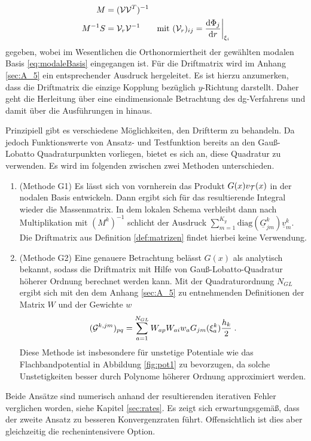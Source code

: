 \begin{align*}
  M &= (\mathcal{V}\mathcal{V}^T)^{-1} \\
  M^{-1}S &= \mathcal{V}_r \mathcal{V}^{-1} \qquad \text{mit } (\mathcal{V}_r)_{ij} = \frac{\mathrm{d}\Phi_j}{\mathrm{d}r}\biggr\rvert_{\xi_i}
\end{align*}
gegeben, wobei im Wesentlichen die Orthonormiertheit der gewählten modalen Basis \eqref{eq:modaleBasis} eingegangen ist. Für die Driftmatrix wird im Anhang \ref{sec:A_5} ein entsprechender Ausdruck hergeleitet. Es ist hierzu anzumerken, dass die Driftmatrix die einzige Kopplung bezüglich $y$-Richtung darstellt. Daher geht die Herleitung über eine eindimensionale Betrachtung des \ac{dg}-Verfahrens und damit über die Ausführungen in \cite{buch} hinaus.

Prinzipiell gibt es verschiedene Möglichkeiten, den Driftterm zu behandeln. Da jedoch Funktionswerte von Ansatz- und Testfunktion bereits an den Gauß-Lobatto Quadraturpunkten vorliegen, bietet es sich an, diese Quadratur zu verwenden. Es wird im folgenden zwischen zwei Methoden unterschieden.
\begin{enumerate}
  \item (Methode G1) Es lässt sich von vornherein das Produkt $G(x)v_{\mathcal{T}}(x)$ in der nodalen Basis entwickeln. Dann ergibt sich für das resultierende Integral wieder die Massenmatrix. In dem lokalen Schema verbleibt dann nach Multiplikation mit $(M^k)^{-1}$ schlicht der Ausdruck ${\sum_{m=1}^{K_y}\text{diag}(\underline{G}^k_{jm})\underline{v}_m^k}$. Die Driftmatrix aus Definition \ref{def:matrizen} findet hierbei keine Verwendung.
  \item (Methode G2) Eine genauere Betrachtung belässt $G(x)$ als analytisch bekannt, sodass die Driftmatrix mit Hilfe von Gauß-Lobatto-Quadratur höherer Ordnung berechnet werden kann. Mit der Quadraturordnung $N_{GL}$ ergibt sich mit den dem Anhang \ref{sec:A_5} zu entnehmenden Definitionen der Matrix $W$ und der Gewichte $w$
  \begin{equation}
    (\mathcal{G}^{k,jm})_{pq} = \sum_{a=1}^{N_{GL}} W_{ap} W_{ai} w_a G_{jm}(\xi_a^k)\frac{h_k}{2} \; .
    \label{eq:G_GL}
  \end{equation}
  Diese Methode ist insbesondere für unstetige Potentiale wie das Flachbandpotential in Abbildung \ref{fig:pot1} zu bevorzugen, da solche Unstetigkeiten besser durch Polynome höherer Ordnung approximiert werden.
\end{enumerate}
Beide Ansätze sind numerisch anhand der resultierenden iterativen Fehler verglichen worden, siehe Kapitel \ref{sec:rates}. Es zeigt sich erwartungsgemäß, dass der zweite Ansatz zu besseren Konvergenzraten führt. Offensichtlich ist dies aber gleichzeitig die rechenintensivere Option.

